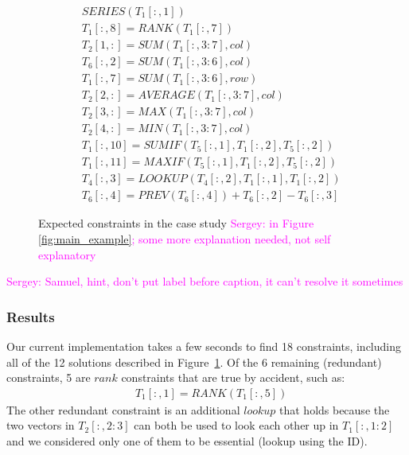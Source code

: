 \documentclass{ecai}
\newcommand{\sergey}[1]{\textcolor{magenta}{{\sc Sergey:} #1}\xspace}
\newcommand{\range}[3]{\ensuremath{#1[#2,#3]}}
\newcommand{\rangeto}[2]{#1{:}#2}
\newcommand{\rangeall}{:}
\newcommand{\eccalc}[2]{\ensuremath{#1 = #2}}
\newcommand{\ecrank}[2]{\eccalc{#1}{\mathit{RANK}(#2)}}
\newcommand{\eclookupf}[4]{\ensuremath{\mathit{LOOKUP}_{#4}(#1, #2, #3)}}
\newcommand{\eclookup}[4]{\eccalc{#1}{\eclookupf{#2}{#3}{#4}{}}}
\newcommand{\ecaggc}[3]{\eccalc{#2}{\mathit{#1}(#3, col)}}
\newcommand{\ecsumc}[2]{\eccalc{#1}{\mathit{SUM}(#2, col)}}
\newcommand{\ecsumr}[2]{\eccalc{#1}{\mathit{SUM}(#2, row)}}
\newcommand{\ecaggif}[5]{\eccalc{#2}{\mathit{#1IF}(#3, #4, #5)}}
\begin{document}
\begin{figure}
  {\small
    \begin{align*}
      & SERIES(\range{T_{1}}{\rangeall}{1}) \\
%
      & \ecrank{\range{T_{1}}{\rangeall}{8}}{\range{T_{1}}{\rangeall}{7}} \\
%
      & \ecsumc{\range{T_{2}}{1}{\rangeall}}{\range{T_{1}}{\rangeall}{\rangeto{3}{7}}} \\
%
      & \ecsumc{\range{T_{6}}{\rangeall}{2}}{\range{T_{1}}{\rangeall}{\rangeto{3}{6}}} \\
%
      & \ecsumr{\range{T_{1}}{\rangeall}{7}}{\range{T_{1}}{\rangeall}{\rangeto{3}{6}}} \\
%
      & \ecaggc{AVERAGE}{\range{T_{2}}{2}{\rangeall}}{\range{T_{1}}{\rangeall}{\rangeto{3}{7}}} \\
%
      & \ecaggc{MAX}{\range{T_{2}}{3}{\rangeall}}{\range{T_{1}}{\rangeall}{\rangeto{3}{7}}} \\
%
      & \ecaggc{MIN}{\range{T_{2}}{4}{\rangeall}}{\range{T_{1}}{\rangeall}{\rangeto{3}{7}}} \\
%
      & \ecaggif{SUM}{\range{T_{1}}{\rangeall}{10}}{\range{T_{5}}{\rangeall}{1}}{\range{T_{1}}{\rangeall}{2}}{\range{T_{5}}{\rangeall}{2}} \\
%
      & \ecaggif{MAX}{\range{T_{1}}{\rangeall}{11}}{\range{T_{5}}{\rangeall}{1}}{\range{T_{1}}{\rangeall}{2}}{\range{T_{5}}{\rangeall}{2}} \\
%
      & \eclookup{\range{T_{4}}{\rangeall}{3}}{\range{T_{4}}{\rangeall}{2}}{\range{T_{1}}{\rangeall}{1}}{\range{T_{1}}{\rangeall}{2}} \\
%
      & \range{T_{6}}{\rangeall}{4} = PREV(\range{T_{6}}{\rangeall}{4}) + \range{T_{6}}{\rangeall}{2} - \range{T_{6}}{\rangeall}{3}
    \end{align*}
  }
  \caption{Expected constraints in the case study \sergey{in Figure \ref{fig:main_example}; some more explanation needed, not self explanatory}}
  \label{fig:sol_example}
\end{figure}
\sergey{Samuel, hint, don't put label before caption, it can't resolve it sometimes}

\subsubsection{Results}
Our current implementation takes a few seconds to find 18 constraints, including all of the 12 solutions described in Figure~\ref{fig:sol_example}.
Of the 6 remaining (redundant) constraints, 5 are $\mathit{rank}$ constraints that are true by accident, such as: \begin{align*}
  & \ecrank{\range{T_1}{\rangeall}{1}}{\range{T_1}{\rangeall}{5}}
\end{align*}
The other redundant constraint is an additional $\mathit{lookup}$ that holds because the two vectors in \range{T_2}{\rangeall}{\rangeto{2}{3}} can both be used to look each other up in \range{T_1}{\rangeall}{\rangeto{1}{2}} and we considered only one of them to be essential (lookup using the ID).
\end{document}
